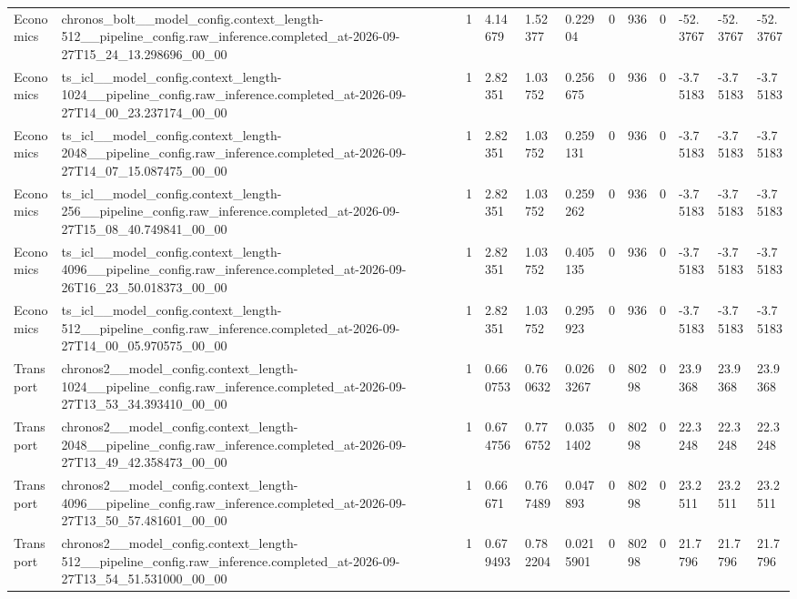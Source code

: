 \begin{tabular}{llllllllllll}
Economics & chronos\_bolt\_\_model\_config.context\_length-512\_\_pipeline\_config.raw\_inference.completed\_at-2026-09-27T15\_24\_13.298696\_00\_00 & 1 & 4.14679 & 1.52377 & 0.22904 & 0 & 936 & 0 & -52.3767 & -52.3767 & -52.3767 \\
Economics & ts\_icl\_\_model\_config.context\_length-1024\_\_pipeline\_config.raw\_inference.completed\_at-2026-09-27T14\_00\_23.237174\_00\_00 & 1 & 2.82351 & 1.03752 & 0.256675 & 0 & 936 & 0 & -3.75183 & -3.75183 & -3.75183 \\
Economics & ts\_icl\_\_model\_config.context\_length-2048\_\_pipeline\_config.raw\_inference.completed\_at-2026-09-27T14\_07\_15.087475\_00\_00 & 1 & 2.82351 & 1.03752 & 0.259131 & 0 & 936 & 0 & -3.75183 & -3.75183 & -3.75183 \\
Economics & ts\_icl\_\_model\_config.context\_length-256\_\_pipeline\_config.raw\_inference.completed\_at-2026-09-27T15\_08\_40.749841\_00\_00 & 1 & 2.82351 & 1.03752 & 0.259262 & 0 & 936 & 0 & -3.75183 & -3.75183 & -3.75183 \\
Economics & ts\_icl\_\_model\_config.context\_length-4096\_\_pipeline\_config.raw\_inference.completed\_at-2026-09-26T16\_23\_50.018373\_00\_00 & 1 & 2.82351 & 1.03752 & 0.405135 & 0 & 936 & 0 & -3.75183 & -3.75183 & -3.75183 \\
Economics & ts\_icl\_\_model\_config.context\_length-512\_\_pipeline\_config.raw\_inference.completed\_at-2026-09-27T14\_00\_05.970575\_00\_00 & 1 & 2.82351 & 1.03752 & 0.295923 & 0 & 936 & 0 & -3.75183 & -3.75183 & -3.75183 \\
Transport & chronos2\_\_model\_config.context\_length-1024\_\_pipeline\_config.raw\_inference.completed\_at-2026-09-27T13\_53\_34.393410\_00\_00 & 1 & 0.660753 & 0.760632 & 0.0263267 & 0 & 80298 & 0 & 23.9368 & 23.9368 & 23.9368 \\
Transport & chronos2\_\_model\_config.context\_length-2048\_\_pipeline\_config.raw\_inference.completed\_at-2026-09-27T13\_49\_42.358473\_00\_00 & 1 & 0.674756 & 0.776752 & 0.0351402 & 0 & 80298 & 0 & 22.3248 & 22.3248 & 22.3248 \\
Transport & chronos2\_\_model\_config.context\_length-4096\_\_pipeline\_config.raw\_inference.completed\_at-2026-09-27T13\_50\_57.481601\_00\_00 & 1 & 0.66671 & 0.767489 & 0.047893 & 0 & 80298 & 0 & 23.2511 & 23.2511 & 23.2511 \\
Transport & chronos2\_\_model\_config.context\_length-512\_\_pipeline\_config.raw\_inference.completed\_at-2026-09-27T13\_54\_51.531000\_00\_00 & 1 & 0.679493 & 0.782204 & 0.0215901 & 0 & 80298 & 0 & 21.7796 & 21.7796 & 21.7796 \\

\end{tabular}
